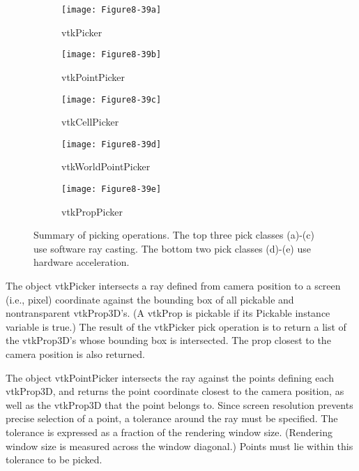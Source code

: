 \begin{figure}[!htb]
    \centering
    \begin{subfigure}{0.32\linewidth}
        \centering
        \texttt{[image: Figure8-39a]}
        \caption{vtkPicker}\label{fig:Figure8-39a}
    \end{subfigure}
    \hfill
    \begin{subfigure}{0.32\linewidth}
        \centering
        \texttt{[image: Figure8-39b]}
        \caption{vtkPointPicker}\label{fig:Figure8-39b}
    \end{subfigure}%
    \hfill
    \begin{subfigure}{0.32\linewidth}
        \centering
        \texttt{[image: Figure8-39c]}
        \caption{vtkCellPicker}\label{fig:Figure8-39c}
    \end{subfigure}%
    \hfill
    \begin{subfigure}{0.48\linewidth}
        \centering
        \texttt{[image: Figure8-39d]}
        \caption{vtkWorldPointPicker}\label{fig:Figure8-39d}
    \end{subfigure}%
    \hfill
    \begin{subfigure}{0.48\linewidth}
        \centering
        \texttt{[image: Figure8-39e]}
        \caption{vtkPropPicker}\label{fig:Figure8-39e}
    \end{subfigure}%
    \caption{Summary of picking operations. The top three pick classes (a)-(c) use software ray casting. The bottom two pick classes (d)-(e) use hardware acceleration.}
    \label{fig:Figure8-39}
\end{figure}

The object vtkPicker intersects a ray defined from camera position to a screen (i.e., pixel) coordinate against the bounding box of all pickable and nontransparent vtkProp3D’s. (A vtkProp is pickable if its Pickable instance variable is true.) The result of the vtkPicker pick operation is to return a list of the vtkProp3D’s whose bounding box is intersected. The prop closest to the camera position is also returned.

The object vtkPointPicker intersects the ray against the points defining each vtkProp3D, and returns the point coordinate closest to the camera position, as well as the vtkProp3D that the point belongs to. Since screen resolution prevents precise selection of a point, a tolerance around the ray must be specified. The tolerance is expressed as a fraction of the rendering window size. (Rendering window size is measured across the window diagonal.) Points must lie within this tolerance to be picked.

